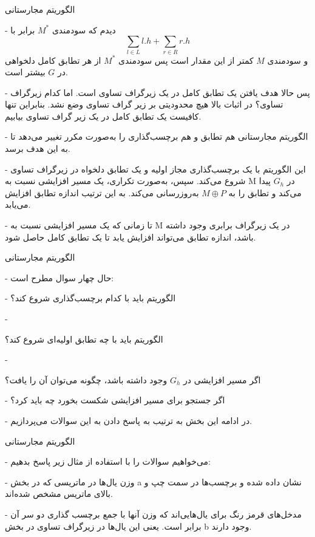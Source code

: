 \begin{itemframe}{الگوریتم مجارستانی}
\item[-]
دیدم که سودمندی $M^\ast$ برابر با
$$
\sum_{l \in L} l.h + \sum_{r \in R} r.h
$$
و سودمندی $M$ کمتر از این مقدار است پس سودمندی $M^\ast$ از هر تطابق کامل دلخواهی در $G‌$ بیشتر است.
\item[-]
پس حالا هدف یافتن یک تطابق کامل در یک زیرگراف تساوی است. اما کدام زیرگراف تساوی؟ در اثبات بالا هیچ محدودیتی بر زیر گراف تساوی وضع نشد. بنابراین تنها کافیست یک تطابق کامل در یک زیر گراف تساوی بیابیم.

\item[-]
الگوریتم مجارستانی هم تطابق و هم برچسب‌گذاری را به‌صورت مکرر تغییر می‌دهد تا به این هدف برسد.
\item[-]
این الگوریتم با یک برچسب‌گذاری مجاز اولیه و یک تطابق دلخواه در زیرگراف تساوی شروع می‌کند. سپس، به‌صورت تکراری، یک مسیر افزایشی نسبت به  M در $G_h$ پیدا می‌کند و تطابق را به $M \oplus P$ به‌روزرسانی می‌کند. به این ترتیب اندازه تطابق افزایش می‌یابد.
\item[-]
تا زمانی که یک مسیر افزایشی نسبت به M در یک زیرگراف برابری وجود داشته باشد، اندازه تطابق می‌تواند افزایش یابد تا یک تطابق کامل حاصل شود.
\end{itemframe}


\begin{itemframe}{الگوریتم مجارستانی}
\item[-]
حال چهار سوال مطرح است:
\item[-]
الگوریتم باید با کدام برچسب‌گذاری شروع کند؟
\item[-]

الگوریتم باید با چه تطابق اولیه‌ای شروع کند؟
\item[-]

اگر مسیر افزایشی در $G_h$ وجود داشته باشد، چگونه می‌توان آن را یافت؟
\item[-]
اگر جستجو برای مسیر افزایشی شکست بخورد چه باید کرد؟
\item[-]
در ادامه این بخش به ترتیب به پاسخ دادن به این سوالات می‌پردازیم.

\end{itemframe}


\begin{itemframe}{الگوریتم مجارستانی}
\decLineSpace[0mm]
\item[-]
می‌خواهیم سوالات را با استفاده از مثال زیر پاسخ بدهیم:
\item[-]
وزن یال‌ها در ماتریسی که در بخش a نشان داده شده و برچسب‌ها در سمت چپ و بالای ماتریس مشخص شده‌اند.
\item[-]
مدخل‌های قرمز رنگ برای یال‌هایی‌اند که وزن آنها با جمع برچسب گذاری دو سر آن برابر است.
یعنی این یال‌ها در زیرگراف تساوی در بخش b وجود دارند.
\end{itemframe}


